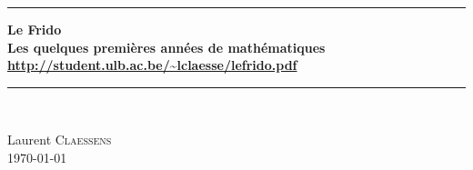 



\thispagestyle{empty}
\begin{center}
  \begin{minipage}{15cm}
    \hrule\par
    \vspace{2mm}
    \begin{center}
        \Huge \bfseries Le Frido \\  {\small Les quelques premières années de mathématiques}
    \normalsize
    \url{http://student.ulb.ac.be/~lclaesse/lefrido.pdf}
    \end{center}
    \hrule\par
  \end{minipage}\\
  \vspace{0.2cm}
\end{center}

\vspace{2cm}

\begin{center}
    Laurent \textsc{Claessens}\\
    \today\\
    \texttt{\GitCommitHexsha}

    \vspace{1cm}

\end{center}

\vfill






